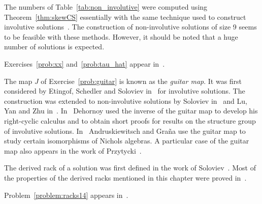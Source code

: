 The numbers of Table~\ref{tab:non_involutive} were computed using 
Theorem~\ref{thm:skewCS} essentially with the same technique used to construct involutive solutions~\cite{AMV}. 
The construction of non-involutive solutions of size 9 seems to be feasible with these methods. 
However, it should be noted that a huge number of solutions is expected. 

Exercises~\ref{prob:xx} and~\ref{prob:tau_hat} appear in~\cite{MR3974961}. 

The map $J$ of Exercise~\ref{prob:guitar} is known as the \emph{guitar map}. 
It was first considered by Etingof, Schedler and
Soloviev in~\cite{MR1722951} for involutive solutions. The construction was extended to non-involutive solutions
by Soloviev in~\cite{MR1809284} and Lu, Yan and Zhu in~\cite{MR1769723}. In~\cite{MR3374524} Dehornoy
used the inverse of the guitar map to develop his right-cyclic calculus and to
obtain short proofs for results on the structure group of involutive solutions. 
In~\cite{MR1994219} Andruskiewitsch and Graña use the guitar map to study certain isomorphisms of Nichols algebras. 
A particular case of the guitar map also appears in the work of Przytycki~\cite{MR2906433}. 

The derived rack of a solution was first defined in the work of Soloviev~\cite{MR1809284}. Most of the properties
of the derived racks mentioned in this chapter were proved in~\cite{MR3974961}.

Problem~\ref{problem:racks14} appears in~\cite{MR3957904}. 

